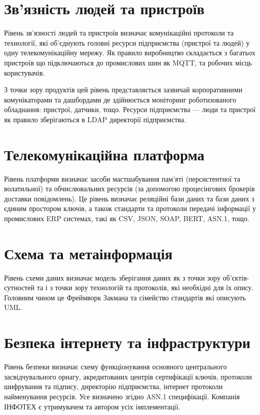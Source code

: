 \section{Зв'язність людей та пристроїв}

Рівень зв'язності людей та пристроїв визначає комунікаційні протоколи та технології,
які об'єднують головні ресурси підприємства (пристрої та людей) у одну
телекомунікаційну мережу. Як правило виробництво складається з багатьох пристроїв
що підключаються до промислових шин як MQTT, та робочих місць користувачів.

З точки зору продуктів цей рівень представляється зазвичай корпоративними
комунікаторами та дашбордами де здійнюється моніторинг роботизованого обладнання:
пристрої, датчики, тощо. Ресурси підприємства — люди та пристрої як правило
зберігаються в LDAP директорії підприємства.

\newpage
\section{Телекомунікаційна платформа}

Рівень платформи визначає засоби мастшабування пам'яті (персистентної та волатильної) та
обчислювальних ресурсів (за допомогою процесінгових брокерів доставки повідомлень).
Це рівень визначає реляційні бази даних та бази даних з єдиним простором ключів,
а також стандарти та протоколи передачі інформації у промислових ERP системах,
такі як CSV, JSON, SOAP, BERT, ASN.1, тощо.

\section{Схема та метаінформація}

Рівень схеми даних визначає модель зберігання даних як з точки зору об'єктів-сутностей
та і з точки зору технологій та протоколів, які необхідні для їх опису.
Головним чином це Фреймворк Закмана та сімейство стандартів які описують UML.

\section{Безпека інтернету та інфраструктури}

Рівень безпеки визначає схему функціонування основного центрального засвідчувального орнагу,
акредитованих центрів сертифікації ключів, протоколи шифрування та підпису, директорію
підприємства, інтернет протоколи найменування ресурсів. Усе визначено згідно ASN.1 специфікації.
Компанія ІНФОТЕХ є утримувачем та автором усіх імплементації.

